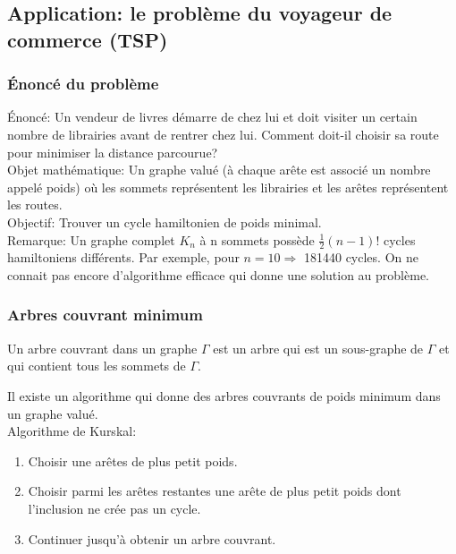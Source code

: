 \subsection{Application: le problème du voyageur de commerce (TSP)}

\subsubsection{Énoncé du problème}

Énoncé: Un vendeur de livres démarre de chez lui et doit visiter un certain nombre de librairies avant de rentrer chez lui. Comment doit-il choisir sa route pour minimiser la distance parcourue? \\ 

Objet mathématique: Un graphe valué (à chaque arête est associé un nombre appelé poids) où les sommets représentent les librairies et les arêtes représentent les routes.\\



Objectif: Trouver un cycle hamiltonien de poids minimal.\\

Remarque: Un graphe complet $K_{n}$ à n sommets possède $\frac{1}{2}(n-1)!$ cycles hamiltoniens différents. Par exemple, pour $n=10 \Rightarrow$ 181440 cycles. On ne connait pas encore d'algorithme efficace qui donne une solution au problème.\\

\subsubsection{Arbres couvrant minimum}

\begin{defn}
Un arbre couvrant dans un graphe $\Gamma$ est un arbre qui est un sous-graphe de $\Gamma$ et qui contient tous les sommets de $\Gamma$.\\
\end{defn}

Il existe un algorithme qui donne des arbres couvrants de poids minimum dans un graphe valué.\\

Algorithme de Kurskal:
\begin{enumerate}[i]
	\item Choisir une arêtes de plus petit poids.
	\item Choisir parmi les arêtes restantes une arête de plus petit poids dont l'inclusion ne crée pas un cycle.
	\item Continuer jusqu'à obtenir un arbre couvrant.\\
\end{enumerate}

